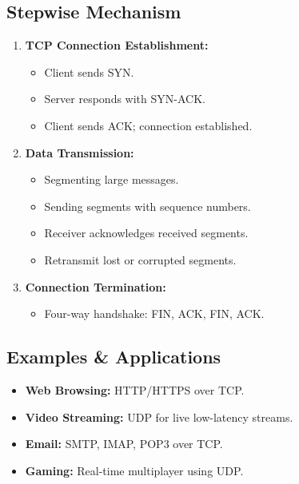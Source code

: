 \documentclass[12pt]{article}
\begin{document}
\subsection{Stepwise Mechanism}
\begin{enumerate}
    \item \textbf{TCP Connection Establishment:}
          \begin{itemize}
              \item Client sends SYN.
              \item Server responds with SYN-ACK.
              \item Client sends ACK; connection established.
          \end{itemize}
    \item \textbf{Data Transmission:}
          \begin{itemize}
              \item Segmenting large messages.
              \item Sending segments with sequence numbers.
              \item Receiver acknowledges received segments.
              \item Retransmit lost or corrupted segments.
          \end{itemize}
    \item \textbf{Connection Termination:}
          \begin{itemize}
              \item Four-way handshake: FIN, ACK, FIN, ACK.
          \end{itemize}
\end{enumerate}

\subsection{Examples \& Applications}
\begin{itemize}
    \item \textbf{Web Browsing:} HTTP/HTTPS over TCP.
    \item \textbf{Video Streaming:} UDP for live low-latency streams.
    \item \textbf{Email:} SMTP, IMAP, POP3 over TCP.
    \item \textbf{Gaming:} Real-time multiplayer using UDP.
\end{itemize}
\end{document}
